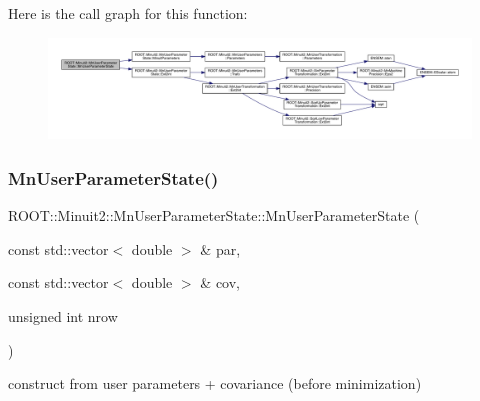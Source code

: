 Here is the call graph for this function\+:\nopagebreak
\begin{figure}[H]
\begin{center}
\leavevmode
\includegraphics[width=350pt]{d3/de0/classROOT_1_1Minuit2_1_1MnUserParameterState_aa4a32c2e51a89c2feca7a376972f1ff5_cgraph}
\end{center}
\end{figure}
\mbox{\label{classROOT_1_1Minuit2_1_1MnUserParameterState_a146a0e2f845431830d795b919bb8f594}} 
\subsubsection{\texorpdfstring{MnUserParameterState()}{MnUserParameterState()}\hspace{0.1cm}{\footnotesize\ttfamily [4/16]}}
{\footnotesize\ttfamily R\+O\+O\+T\+::\+Minuit2\+::\+Mn\+User\+Parameter\+State\+::\+Mn\+User\+Parameter\+State (\begin{DoxyParamCaption}\item[{const std\+::vector$<$ double $>$ \&}]{par,  }\item[{const std\+::vector$<$ double $>$ \&}]{cov,  }\item[{unsigned int}]{nrow }\end{DoxyParamCaption})}



construct from user parameters + covariance (before minimization) 

